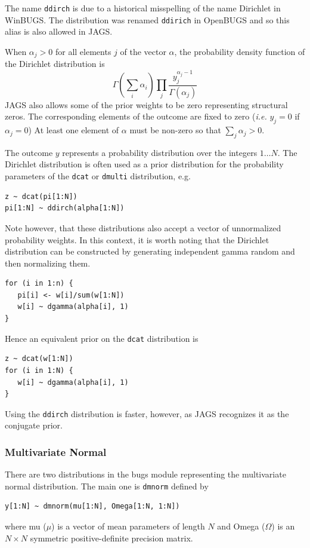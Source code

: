 \documentclass[11pt, a4paper, titlepage]{report}
\begin{document}
The name \texttt{ddirch} is due to a historical misspelling of the
name Dirichlet in WinBUGS. The distribution was renamed
\texttt{ddirich} in OpenBUGS and so this alias is also allowed in
JAGS.

When $\alpha_j > 0$ for all elements $j$ of the vector $\alpha$, the
probability density function of the Dirichlet distribution is 
\[
\Gamma(\sum_i \alpha_i) \prod_j 
\frac{\textstyle y_j^{\alpha_j - 1}}{\textstyle \Gamma(\alpha_j)}
\]
JAGS also allows some of the prior weights to be zero representing
structural zeros. The corresponding elements of the outcome are fixed
to zero ({\em i.e.}  $y_j = 0$ if $\alpha_j = 0$) At least one
element of $\alpha$ must be non-zero so that $\sum_j \alpha_j > 0$.

The outcome $y$ represents a probability distribution over the
integers $1 \ldots N$. The Dirichlet distribution is often used as
a prior distribution for the probability parameters of the \texttt{dcat}
or \texttt{dmulti} distribution, e.g.
\begin{verbatim}
z ~ dcat(pi[1:N])
pi[1:N] ~ ddirch(alpha[1:N])
\end{verbatim}
Note however, that these distributions also accept a vector of
unnormalized probability weights. In this context, it is worth noting
that the Dirichlet distribution can be constructed by generating
independent gamma random and then normalizing them.
\begin{verbatim}
for (i in 1:n) {
   pi[i] <- w[i]/sum(w[1:N])
   w[i] ~ dgamma(alpha[i], 1)
}
\end{verbatim}
Hence an equivalent prior on the \texttt{dcat} distribution is
\begin{verbatim}
z ~ dcat(w[1:N])
for (i in 1:N) {
   w[i] ~ dgamma(alpha[i], 1)
}
\end{verbatim}
Using the \texttt{ddirch} distribution is faster, however, as
JAGS recognizes it as the conjugate prior.

\subsubsection{Multivariate Normal}

There are two distributions in the bugs module representing the
multivariate normal distribution. The main one is \texttt{dmnorm}
defined by
\begin{verbatim}
y[1:N] ~ dmnorm(mu[1:N], Omega[1:N, 1:N])
\end{verbatim}
where mu ($\mu$) is a vector of mean parameters of length $N$ and
Omega ($\Omega$) is an $N \times N$ symmetric positive-definite
precision matrix.
\end{document}
